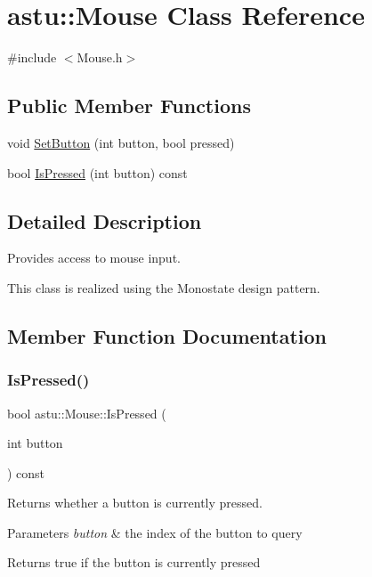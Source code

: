 \hypertarget{classastu_1_1Mouse}{}\section{astu\+:\+:Mouse Class Reference}
\label{classastu_1_1Mouse}


{\ttfamily \#include $<$Mouse.\+h$>$}

\subsection*{Public Member Functions}
\begin{DoxyCompactItemize}
\item 
void \hyperlink{classastu_1_1Mouse_a1f60d23fe113d85a80569a5a3539eabf}{Set\+Button} (int button, bool pressed)
\item 
bool \hyperlink{classastu_1_1Mouse_a400f6483be85ac0e4694806bdd22e25a}{Is\+Pressed} (int button) const
\end{DoxyCompactItemize}


\subsection{Detailed Description}
Provides access to mouse input.

This class is realized using the Monostate design pattern. 

\subsection{Member Function Documentation}
\mbox{\label{classastu_1_1Mouse_a400f6483be85ac0e4694806bdd22e25a}} 
\subsubsection{\texorpdfstring{Is\+Pressed()}{IsPressed()}}
{\footnotesize\ttfamily bool astu\+::\+Mouse\+::\+Is\+Pressed (\begin{DoxyParamCaption}\item[{int}]{button }\end{DoxyParamCaption}) const}

Returns whether a button is currently pressed.


\begin{DoxyParams}{Parameters}
{\em button} & the index of the button to query \\
\hline
\end{DoxyParams}
\begin{DoxyReturn}{Returns}
{\ttfamily true} if the button is currently pressed 
\end{DoxyReturn}
\mbox{\label{classastu_1_1Mouse_a1f60d23fe113d85a80569a5a3539eabf}} 
